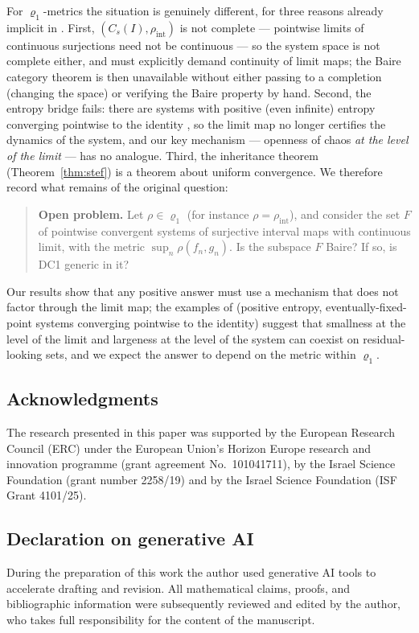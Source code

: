 \documentclass[11pt]{article}
\newcommand{\I}{I}
\newcommand{\Cs}{C_s(\I)}
\begin{document}
For $\varrho_1$-metrics the situation is genuinely different, for three reasons
already implicit in \cite{BR}.  First, $(\Cs,\rho_{\mathrm{int}})$ is not complete
--- pointwise limits of continuous surjections need not be continuous --- so the
system space is not complete either, and \cite{BR} must explicitly demand
continuity of limit maps; the Baire category theorem is then unavailable without
either passing to a completion (changing the space) or verifying the Baire
property by hand.  Second, the entropy bridge fails: there are systems with
positive (even infinite) entropy converging pointwise to the identity
\cite[Figure 1]{BR}, so the limit map no longer certifies the dynamics of the
system, and our key mechanism --- openness of chaos \emph{at the level of the
limit} --- has no analogue.  Third, the inheritance theorem
(Theorem~\ref{thm:stef}) is a theorem about uniform convergence.  We therefore
record what remains of the original question:

\begin{quote}
\textbf{Open problem.}  Let $\rho\in\varrho_1$ (for instance
$\rho=\rho_{\mathrm{int}}$), and consider the set $F$ of pointwise convergent
systems of surjective interval maps with continuous limit, with the metric
$\sup_n\rho(f_n,g_n)$.  Is the subspace $F$ Baire?  If so, is DC1 generic in it?
\end{quote}

Our results show that any positive answer must use a mechanism that does not
factor through the limit map; the examples of \cite[Section 3]{BR} (positive
entropy, eventually-fixed-point systems converging pointwise to the identity)
suggest that smallness at the level of the limit and largeness at the level of the
system can coexist on residual-looking sets, and we expect the answer to depend on
the metric within $\varrho_1$.

\subsection*{Acknowledgments}
The research presented in this paper was supported by the European Research Council
(ERC) under the European Union's Horizon Europe research and innovation programme
(grant agreement No.\ 101041711), by the Israel Science Foundation (grant number
2258/19) and by the Israel Science Foundation (ISF Grant 4101/25).

\subsection*{Declaration on generative AI}
During the preparation of this work the author used generative AI tools to
accelerate drafting and revision.  All mathematical claims, proofs, and
bibliographic information were subsequently reviewed and edited by the author, who
takes full responsibility for the content of the manuscript.
\end{document}
